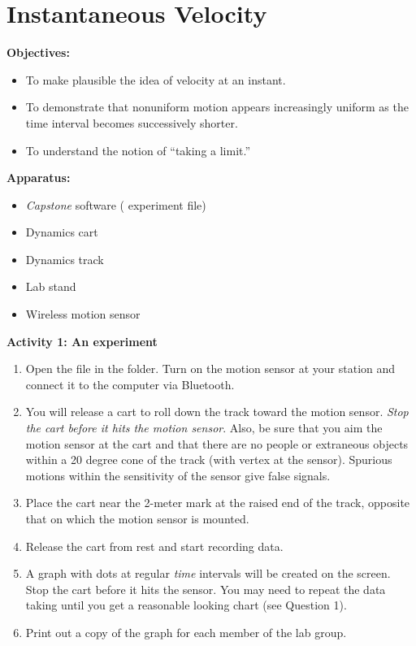 \section{Instantaneous Velocity}

\makelabheader %

{\noindent \bf Objectives:} 

\begin{itemize}[nosep]
\item To make plausible the idea of velocity at an instant. 
\item To demonstrate that nonuniform motion appears increasingly uniform as the time interval becomes successively shorter. 
\item To understand the notion of ``taking a limit.''
\end{itemize}

\textbf{Apparatus:}

\begin{itemize}
\item \textit{Capstone} software ( experiment file)
\item Dynamics cart
\item Dynamics track
\item Lab stand
\item Wireless motion sensor
\end{itemize}
{\noindent \bf Activity 1: An experiment} \begin{enumerate}

\item Open the file  in the \filename{\coursefolder} folder. Turn on the motion sensor at your station and connect it to the computer via Bluetooth.

\item You will release a cart to roll down the track toward the motion
sensor. \emph{Stop the cart before it hits the motion sensor}. Also, be sure
that you aim the motion sensor at the cart and that there are no people or
extraneous objects within a 20 degree cone of the track (with vertex
at the sensor). Spurious motions within the sensitivity of
the sensor give false signals.

\item Place the cart near the 2-meter mark at the raised end of the track, opposite that on which the motion sensor is mounted.

\item Release the cart from rest and start recording data.

\item A graph with dots at regular \textit{time} intervals will be created on the screen. Stop the cart before it hits the sensor. You may need to repeat the data taking until you get a reasonable looking chart (see Question 1).

\item Print out a copy of the graph for each member of the lab group.

\end{enumerate}

